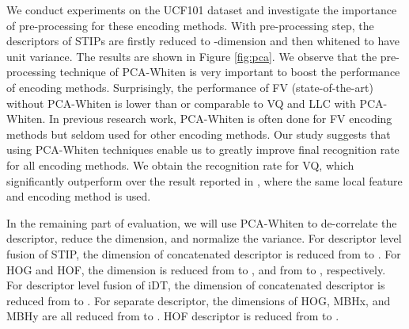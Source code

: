 \documentclass[twocolumn]{svjour3}          \smartqed  \usepackage{slashbox}
\begin{document}
We conduct experiments on the UCF101 dataset and investigate the importance of pre-processing for these encoding methods. With pre-processing step, the descriptors of STIPs are firstly reduced to -dimension and then whitened to have unit variance. The results are shown in Figure \ref{fig:pca}. We observe that the pre-processing technique of PCA-Whiten is very important to boost the performance of encoding methods. Surprisingly, the performance of FV (state-of-the-art) without PCA-Whiten is lower than or comparable to VQ and LLC with PCA-Whiten. In previous research work, PCA-Whiten is often done for FV encoding methods but seldom used for other encoding methods. Our study suggests that using PCA-Whiten techniques enable us to greatly improve final recognition rate for all encoding methods. We obtain the recognition rate  for VQ, which significantly outperform over the result  reported in \cite{SOOMRO12}, where the same local feature and encoding method is used.

In the remaining part of evaluation, we will use PCA-Whiten to de-correlate the descriptor, reduce the dimension, and normalize the variance. For descriptor level fusion of STIP, the dimension of concatenated descriptor is reduced from  to . For HOG and HOF, the dimension is reduced from  to , and from  to , respectively. For descriptor level fusion of iDT, the dimension of concatenated descriptor is reduced from  to . For separate descriptor, the dimensions of HOG, MBHx, and MBHy are all reduced from  to . HOF descriptor is reduced from  to .
\end{document}
